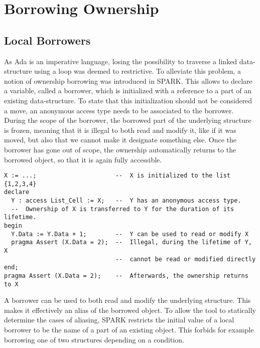 \documentclass[runningheads]{llncs}
\begin{document}
\section{Borrowing Ownership}
\subsection{Local Borrowers}

As Ada is an imperative language, losing the possibility to traverse a linked data-structure using a loop was deemed to restrictive. To alleviate this problem, a notion of ownership borrowing was introduced in SPARK. This allows to declare a variable, called a borrower, which is initialized with a reference to a part of an existing data-structure. To state that this initialization should not be considered a move, an anonymous access type needs to be associated to the borrower. During the scope of the borrower, the borrowed part of the underlying structure is frozen, meaning that it is illegal to both read and modify it, like if it was moved, but also that we cannot make it designate something else. Once the borrower has gone out of scope, the ownership automatically returns to the borrowed object, so that it is again fully accessible.
\begin{lstlisting}
X := ...;                      --  X is initialized to the list {1,2,3,4}
declare
  Y : access List_Cell := X;   --  Y has an anonymous access type.
  --  Ownership of X is transferred to Y for the duration of its lifetime.
begin
  Y.Data := Y.Data + 1;        --  Y can be used to read or modify X
  pragma Assert (X.Data = 2);  --  Illegal, during the lifetime of Y, X
                               --  cannot be read or modified directly
end;
pragma Assert (X.Data = 2);    --  Afterwards, the ownership returns to X
\end{lstlisting}
A borrower can be used to both read and modify the underlying structure. This makes it effectively an alias of the borrowed object. To allow the tool to statically determine the cases of aliasing, SPARK restricts the initial value of a local borrower to be the name of a part of an existing object. This forbids for example borrowing one of two structures depending on a condition.
\end{document}
